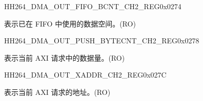 \begin{register}{H}{H264\_DMA\_OUT\_FIFO\_BCNT\_CH2\_REG}{0x0274}\label{regdesc:H264DMAOUTFIFOBCNTCH2REG}
%
%
\regnewline%
\begin{regdesc}\begin{reglist}
\label{fielddesc:H264DMAOUTCMDFIFOOUTFIFOBCNTCH2}\item [H264\_DMA\_OUT\_CMDFIFO\_OUTFIFO\_BCNT\_CH2] 表示已在 FIFO 中使用的数据空间。(RO)
\end{reglist}\end{regdesc}
\end{register}


\begin{register}{H}{H264\_DMA\_OUT\_PUSH\_BYTECNT\_CH2\_REG}{0x0278}\label{regdesc:H264DMAOUTPUSHBYTECNTCH2REG}
%
%
\regnewline%
\begin{regdesc}\begin{reglist}
\label{fielddesc:H264DMAOUTCMDFIFOPUSHBYTECNTCH2}\item [H264\_DMA\_OUT\_CMDFIFO\_PUSH\_BYTECNT\_CH2] 表示当前 AXI 请求中的数据量。(RO)
\end{reglist}\end{regdesc}
\end{register}


\begin{register}{H}{H264\_DMA\_OUT\_XADDR\_CH2\_REG}{0x027C}\label{regdesc:H264DMAOUTXADDRCH2REG}
%
\regnewline%
\begin{regdesc}\begin{reglist}
\label{fielddesc:H264DMAOUTCMDFIFOXADDRCH2}\item [H264\_DMA\_OUT\_CMDFIFO\_XADDR\_CH2] 表示当前 AXI 请求的地址。(RO)
\end{reglist}\end{regdesc}
\end{register}

